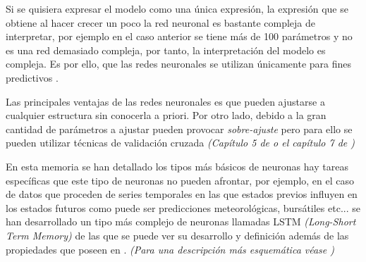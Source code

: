 \noindent Si se quisiera expresar el modelo como una única expresión, la expresión que se obtiene al hacer crecer un poco la red neuronal es bastante compleja de interpretar, por ejemplo en el caso anterior se tiene más de 100 parámetros y no es una red demasiado compleja, por tanto, la interpretación del modelo es compleja. Es por ello, que las redes neuronales se utilizan únicamente para fines predictivos \cite{Hastie 2001, James 2013}. 

\noindent Las principales ventajas de las redes neuronales es que pueden ajustarse a cualquier estructura sin conocerla a priori. Por otro lado, debido a la gran cantidad de parámetros a ajustar pueden provocar \emph{sobre-ajuste} pero para ello se pueden utilizar técnicas de validación cruzada \emph{(Capítulo 5 de \cite{James 2013} o el capítulo 7 de \cite{Hastie 2001})}

\noindent En esta memoria se han detallado los tipos más básicos de neuronas hay tareas específicas que este tipo de neuronas no pueden afrontar, por ejemplo, en el caso de datos que proceden de series temporales en las que estados previos influyen en los estados futuros como puede ser predicciones meteorológicas, bursátiles etc... se han desarrollado un tipo más complejo de neuronas llamadas LSTM \emph{(Long-Short Term Memory)} de las que se puede ver su desarrollo y definición además de las propiedades que poseen en \cite{Hochreiter 1997}. \emph{(Para una descripción más esquemática véase \cite{Neural Designer})}

